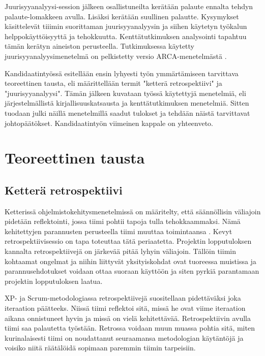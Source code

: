 Juurisyyanalyysi-session jälkeen osallistuneilta kerätään palaute ennalta tehdyn palaute-lomakkeen avulla. Lisäksi kerätään suullinen palautte. Kysymykset käsittelevät tiiimin suorittaman juurisyyanalyysin ja siihen käytetyn työkalun helppokäyttöisyyttä ja tehokkuutta. Kenttätutkimuksen analysointi tapahtuu tämän kerätyn aineiston perusteella. Tutkimuksessa käytetty juurisyyanalyysimenetelmä on pelkistetty versio ARCA-menetelmästä \citep{Lehtinen2011}.

Kandidaatintyössä esitellään ensin lyhyesti työn ymmärtämiseen tarvittava teoreettinen tausta, eli määrittellään termit "ketterä retrospektiivi" ja "juurisyyanalyysi". Tämän jälkeen kuvataan työssä käytettyjä menetelmiä, eli järjestelmällistä kirjallisuuskatsausta ja kenttätutkimuksen menetelmiä. Sitten tuodaan julki näillä menetelmillä saadut tulokset ja tehdään näistä tarvittavat johtopäätökset. Kandidaatintyön viimeinen kappale on yhteenveto.

\section{Teoreettinen tausta}
\subsection{Ketterä retrospektiivi}
Ketterissä ohjelmistokehitysmenetelmissä on määritelty, että säännöllisin väliajoin pidetään reflektointi, jossa tiimi pohtii tapoja tulla tehokkaammaksi. Nämä kehitettyjen parannusten perusteella tiimi muuttaa toimintaansa \citep{AgileManifestoPrinciples}. Kevyt retrospektiivisessio on tapa toteuttaa tätä periaatetta. Projektin lopputuloksen kannalta retrospektiivejä on järkevää pitää lyhyin väliajoin. Tällöin tiimin kohtaamat ongelmat ja niihin liittyvät yksityiskohdat ovat tuoreessa muistissa ja parannusehdotukset voidaan ottaa suoraan käyttöön ja siten pyrkiä parantamaan projektin lopputuloksen laatua. \citep{Cockburn2002}

XP- ja Scrum-metodologiassa retrospektiivejä suositellaan pidettäväksi joka iteraation päätteeks. Niissä tiimi reflektoi sitä, missä he ovat viime iteraation aikana onnistuneet hyvin ja missä on vielä kehitettävää. \citep{Lindstrom2004, ScrumGuide2011} Retrospektiivin avulla tiimi saa palautetta työstään. Retrossa voidaan muun muassa pohtia sitä, miten kurinalaisesti tiimi on noudattanut seuraamansa metodologian käytäntöjä ja voisiko niitä räätälöidä sopimaan paremmin tiimin tarpeisiin. \citep{Lindstrom2004}

